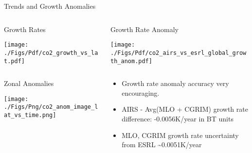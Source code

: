 \documentclass[10pt,t]{beamer}
\begin{document}
\begin{frame}[label={sec:orgf269d09}]{\cd Trends and Growth Anomalies}
\vspace{-0.35in}
\begin{columns}
\begin{column}{0.5\columnwidth}
\begin{block}{\footnotesize Growth Rates}
\vspace{-0.1in}
\begin{center}
\texttt{[image: ./Figs/Pdf/co2\_growth\_vs\_lat.pdf]}
\end{center}
\end{block}
\end{column}

\begin{column}{0.5\columnwidth}
\begin{block}{\footnotesize Growth Rate Anomaly}
\vspace{-0.1in}
\begin{center}
\texttt{[image: ./Figs/Pdf/co2\_airs\_vs\_esrl\_global\_growth\_anom.pdf]}
\end{center}
\end{block}
\end{column}
\end{columns}

\vspace{-0.2in}

\begin{columns}
\begin{column}{0.5\columnwidth}
\begin{block}{\footnotesize Zonal Anomalies}
\vspace{-0.1in}
\begin{center}
\texttt{[image: ./Figs/Png/co2\_anom\_image\_lat\_vs\_time.png]}
\end{center}
\end{block}
\end{column}

\begin{column}{0.5\columnwidth}
\begin{block}{}
\vspace{-0.2in}
\begin{footnotesize}
\begin{itemize}
\item Growth rate anomaly accuracy very encouraging.
\item AIRS - Avg(MLO + CGRIM) growth rate difference: -0.0056K/year in BT units
\item MLO, CGRIM growth rate uncertainty from ESRL \textasciitilde{}0.0051K/year
\end{itemize}
\end{footnotesize}
\end{block}
\end{column}
\end{columns}
\end{frame}
\end{document}
